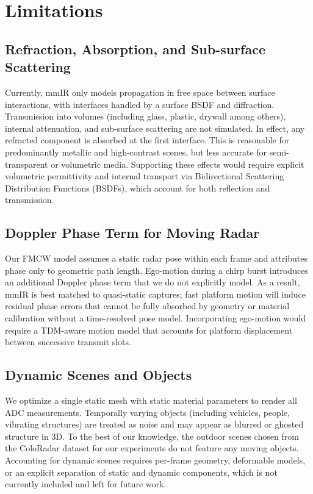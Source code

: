 \section{Limitations}
\label{sec:limitations}

\subsection{Refraction, Absorption, and Sub-surface Scattering}

Currently, mmIR only models propagation in free space between surface interactions, with interfaces handled by a surface BSDF and diffraction. Transmission into volumes (including glass, plastic, drywall among others), internal attenuation, and sub-surface scattering are not simulated. In effect, any refracted component is absorbed at the first interface. This is reasonable for predominantly metallic and high-contrast scenes, but less accurate for semi-transparent or volumetric media. Supporting these effects would require explicit volumetric permittivity and internal transport via Bidirectional Scattering Distribution Functions (BSDFs), which account for both reflection and transmission.

\subsection{Doppler Phase Term for Moving Radar}

Our FMCW model assumes a static radar pose within each frame and attributes phase only to geometric path length. Ego-motion during a chirp burst introduces an additional Doppler phase term that we do not explicitly model. As a result, mmIR is best matched to quasi-static captures; fast platform motion will induce residual phase errors that cannot be fully absorbed by geometry or material calibration without a time-resolved pose model. Incorporating ego-motion would require a TDM-aware motion model that accounts for platform displacement between successive transmit slots.

\subsection{Dynamic Scenes and Objects}

We optimize a single static mesh with static material parameters to render all ADC measurements. Temporally varying objects (including vehicles, people, vibrating structures) are treated as noise and may appear as blurred or ghosted structure in 3D. To the best of our knowledge, the outdoor scenes chosen from the ColoRadar dataset for our experiments do not feature any moving objects. Accounting for dynamic scenes requires per-frame geometry, deformable models, or an explicit separation of static and dynamic components, which is not currently included and left for future work.

